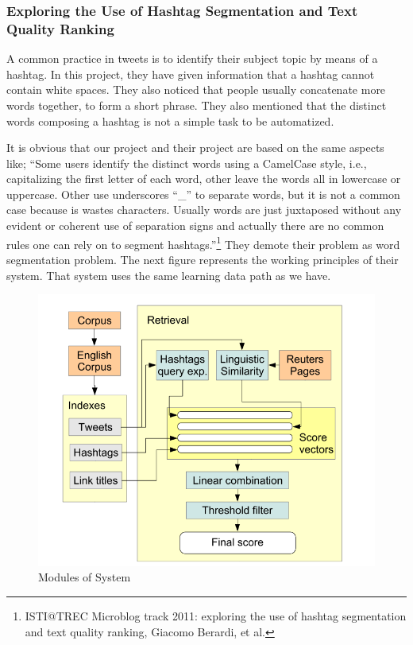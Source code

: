\documentclass[12pt]{comjnl}
\begin{document}
\subsubsection{Exploring the Use of Hashtag Segmentation and Text Quality Ranking}
A common practice in tweets is to identify their subject topic by means of a hashtag. In this project, they have given information that a hashtag cannot contain white spaces. They also noticed that people usually concatenate more words together, to form a short phrase. They also mentioned that the distinct words composing a hashtag is not a simple task to be automatized. 

It is obvious that our project and their project are based on the same aspects like; 
``Some users identify the distinct words using a CamelCase style, i.e., capitalizing
the first letter of each word, other leave the words all in lowercase or uppercase. Other use
underscores “\_” to separate words, but it is not a common case because is wastes characters.
Usually words are just juxtaposed without any evident or coherent use of separation signs
and actually there are no common rules one can rely on to segment hashtags.''\footnote{ISTI@TREC Microblog track 2011: exploring the use of hashtag segmentation and text quality ranking, Giacomo Berardi, et al.}
They demote their problem as word segmentation problem. The next figure represents the working principles of their system. That system uses the same learning data path as we have.

\begin{figure}[htbp]
\centering
\includegraphics[width=5in]{paper1_2.png}
\caption{Modules of System}\label{fig:paper1}
\end{figure}
\end{document}
